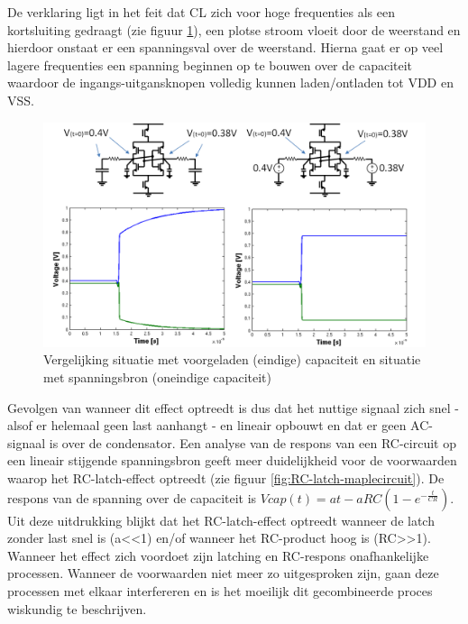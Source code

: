 De verklaring ligt in het feit dat CL zich voor hoge frequenties als een kortsluiting gedraagt (zie figuur \ref{fig:RC-latch-explain}), een plotse stroom vloeit door de weerstand en hierdoor onstaat er een spanningsval over de weerstand. Hierna gaat er op veel lagere frequenties een spanning beginnen op te bouwen over de capaciteit waardoor de ingangs-uitgansknopen volledig kunnen laden/ontladen tot VDD en VSS.
\begin{figure}
  \centering
  \includegraphics[width=\textwidth]{../fig/hfdstk-sensamp-RC-latch-explain.png}
  \caption[Invloed capaciteit op RC-latch effect]{Vergelijking situatie met voorgeladen (eindige) capaciteit en situatie met spanningsbron (oneindige capaciteit)}
  \label{fig:RC-latch-explain}
\end{figure}
Gevolgen van wanneer dit effect optreedt is dus dat het nuttige signaal zich snel - alsof er helemaal geen last aanhangt - en lineair opbouwt en dat er geen AC-signaal is over de condensator. Een analyse van de respons van een RC-circuit op een lineair stijgende spanningsbron geeft meer duidelijkheid voor de voorwaarden waarop het RC-latch-effect optreedt (zie figuur \ref{fig:RC-latch-maplecircuit}). De respons van de spanning over de capaciteit is $Vcap(t) =  at - aRC(1-e^{-{\frac {t}{CR}}})$. Uit deze uitdrukking blijkt dat het RC-latch-effect optreedt wanneer de latch zonder last snel is (a<<1) en/of wanneer het RC-product hoog is (RC>>1).
Wanneer het effect zich voordoet zijn latching en RC-respons onafhankelijke processen. Wanneer de voorwaarden niet meer zo uitgesproken zijn, gaan deze processen met elkaar interfereren en is het moeilijk dit gecombineerde proces wiskundig te beschrijven.
